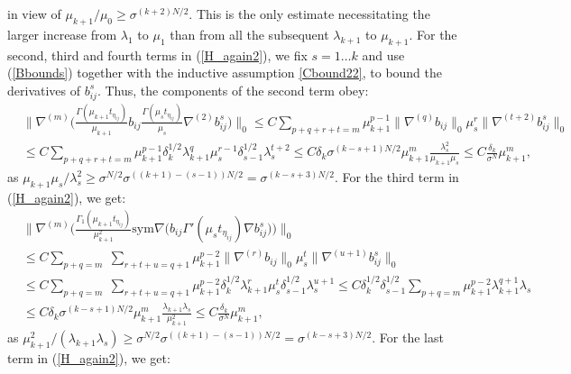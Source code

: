 \documentclass[reqno,twoside,11pt]{amsart}
\newcommand{\sym}{\mathrm{sym}}
\numberwithin{equation}{section}
\theoremstyle{plain}
\theoremstyle{definition}
\begin{document}
in view of $\mu_{k+1}/\mu_0\geq\sigma^{(k+2)N/2}$. This
is the only estimate necessitating the larger increase from
$\lambda_{1}$ to $\mu_1$ than from all the subsequent $\lambda_{k+1}$ to $\mu_{k+1}$.
For the second, third and fourth terms in (\ref{H_again2}), we fix $s=1\ldots k$ and use
(\ref{Bbounds}) together with 
the inductive assumption \ref{Cbound22}, to bound the derivatives of
$b_{ij}^s$. Thus, the components of the second term obey:
\begin{equation*}
\begin{split}
& \big\|\nabla^{(m)}\Big(\frac{\Gamma(\mu_{k+1}t_{\eta_{ij}})}{\mu_{k+1}} b_{ij}
\frac{\Gamma(\mu_s t_{\eta_{ij}})}{\mu_s}\nabla^{(2)}b_{ij}^s
\Big)\big\|_0\leq C\sum_{p+q+r+t=m}\mu_{k+1}^{p-1}\|\nabla^{(q)}b_{ij}\|_0
\mu_s^r \|\nabla^{(t+2)}b^s_{ij}\|_0\\ &  \leq
C\sum_{p+q+r+t=m}\mu_{k+1}^{p-1} \delta_k^{1/2}\lambda_{k+1}^q\mu_s^{r-1}\delta_{s-1}^{1/2}
\lambda_s^{t+2} \leq C\delta_k
\sigma^{(k-s+1)N/2}\mu_{k+1}^m\frac{\lambda_s^2}{\mu_{k+1}
  \mu_s}\leq C\frac{\delta_k}{\sigma^N}\mu_{k+1}^m,
\end{split}
\end{equation*}
as $\mu_{k+1}\mu_s/ \lambda_s^2\geq \sigma^{N/2} \sigma^{((k+1)-(s-1))N/2}=
\sigma^{(k-s+3)N/2}$.
For the third term in (\ref{H_again2}), we get:
\begin{equation*}
\begin{split}
& \big\|\nabla^{(m)}\Big(\frac{\Gamma_1(\mu_{k+1}t_{\eta_{ij}})}{\mu_{k+1}^2} \sym\nabla\big(b_{ij}
\Gamma'(\mu_s t_{\eta_{ij}})\nabla b_{ij}^s\big) \Big)\big\|_0 \\ & \leq C\sum_{p+q=m}
\; \sum_{r+t+u=q+1} \mu_{k+1}^{p-2}\|\nabla^{(r)}b_{ij}\|_0
\mu_s^t \|\nabla^{(u+1)}b^s_{ij}\|_0 \\ & \leq C\sum_{p+q=m}\;
\sum_{r+t+u=q+1} \mu_{k+1}^{p-2}\delta_k^{1/2}\lambda_{k+1}^r\mu_s^t\delta_{s-1}^{1/2}\lambda_s^{u+1}
\leq C \delta_k^{1/2}\delta_{s-1}^{1/2} \sum_{p+q=m}\mu_{k+1}^{p-2}\lambda_{k+1}^{q+1}\lambda_s
\\ & \leq C \delta_k \sigma^{(k-s+1)N/2}\mu_{k+1}^m\frac{\lambda_{k+1}\lambda_s}{\mu_{k+1}^2}
\leq C\frac{\delta_k}{\sigma^N}\mu_{k+1}^m,
\end{split}
\end{equation*}
as $\mu_{k+1}^2/(\lambda_{k+1}\lambda_s)\geq 
\sigma^{N/2}\sigma^{((k+1)-(s-1))N/2}= \sigma^{(k-s+3)N/2}$.
For the last term  in (\ref{H_again2}), we get:
\end{document}

